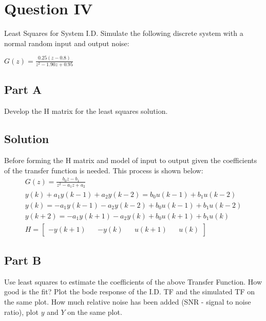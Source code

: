 \documentclass{article}
\begin{document}
\section*{Question IV}
Least Squares for System I.D. Simulate the following discrete system with a normal random input and output noise:
\begin{center}
    $G(z) = \frac{0.25(z - 0.8)}{z^2 - 1.90z + 0.95}$
\end{center}
\subsection*{Part A}
Develop the H matrix for the least squares solution.
\subsection*{Solution}
Before forming the H matrix and model of input to output given the coefficients of the transfer function is needed. This process is shown below:
\begin{gather*}
    G(z) = \frac{b_0 z - b_1}{z^2 - a_1z + a_2} \\
    y(k) + a_1 y(k-1) + a_2 y(k-2) = b_0 u(k-1) + b_1 u(k-2) \\
    y(k) = -a_1 y(k-1) - a_2 y(k-2) + b_0 u(k-1) + b_1 u(k-2) \\
    y(k+2) = -a_1 y(k+1) - a_2 y(k) + b_0 u(k+1) + b_1 u(k) \\
    H = \begin{bmatrix} -y(k+1) && -y(k) && u(k+1) && u(k) \end{bmatrix}
\end{gather*}

\subsection*{Part B}
Use least squares to estimate the coefficients of the above Transfer Function.  How good is the fit? Plot the bode response of the I.D. TF 
and the simulated TF on the same plot.  How much relative noise has been added (SNR - signal to noise ratio), plot $y$ and $Y$ on the same plot.
\end{document}
